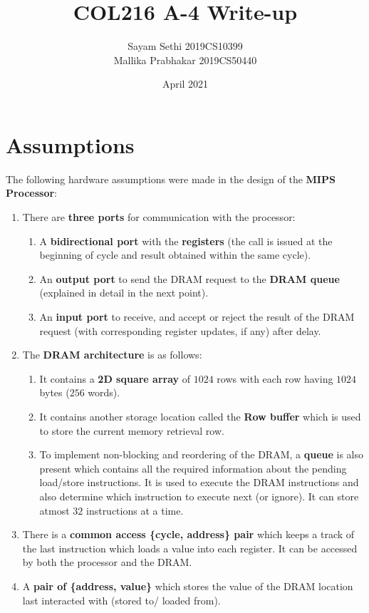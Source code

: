 \documentclass{article}
\title{COL216 A-4 Write-up}
\author{Sayam Sethi 2019CS10399 \\ Mallika Prabhakar 2019CS50440 }
\date{April 2021}
\begin{document}
\maketitle

\section{Assumptions}
The following hardware assumptions were made in the design of the \textbf{MIPS Processor}:
\begin{enumerate}
    \item There are \textbf{three ports} for communication with the processor:
        \begin{enumerate}
            \item A \textbf{bidirectional port} with the \textbf{registers} (the call is issued at the beginning of cycle and result obtained within the same cycle).
            \item An \textbf{output port} to send the DRAM request to the \textbf{DRAM queue} (explained in detail in the next point).
            \item An \textbf{input port} to receive, and accept or reject the result of the DRAM request (with corresponding register updates, if any) after delay.
        \end{enumerate}
    \item The \textbf{DRAM architecture} is as follows:
        \begin{enumerate}
            \item It contains a \textbf{2D square array} of $1024$ rows with each row having $1024$ bytes ($256$ words).
            \item It contains another storage location called the \textbf{Row buffer} which is used to store the current memory retrieval row.
            \item To implement non-blocking and reordering of the DRAM, a \textbf{queue} is also present which contains all the required information about the pending load/store instructions. It is used to execute the DRAM instructions and also determine which instruction to execute next (or ignore). It can store atmost $32$ instructions at a time.
        \end{enumerate}
    \item There is a \textbf{common access \{cycle, address\} pair} which keeps a track of the last instruction which loads a value into each register. It can be accessed by both the processor and the DRAM.
    \item A \textbf{pair of \{address, value\}} which stores the value of the DRAM location last interacted with (stored to/ loaded from).
\end{enumerate}
\end{document}
